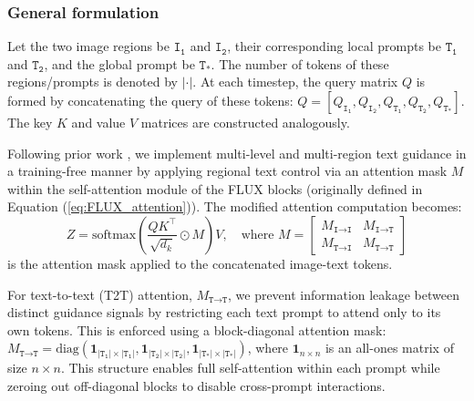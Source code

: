 \documentclass{article}
\begin{document}
\vspace{-1mm}
\subsubsection{General formulation}
\vspace{-1mm}

Let the two image regions be $\texttt{I}_\texttt{1}$ and $\texttt{I}_\texttt{2}$, their corresponding local prompts be $\texttt{T}_\texttt{1}$ and $\texttt{T}_\texttt{2}$, and the global prompt be $\texttt{T}_\texttt{*}$. The number of tokens of these regions/prompts is denoted by $|\cdot|$. At each timestep, the query matrix $Q$ is formed by concatenating the query of these tokens: $ Q= [Q_{\texttt{I}_\texttt{1}}, Q_{\texttt{I}_\texttt{2}}, Q_{\texttt{T}_\texttt{1}}, Q_{\texttt{T}_\texttt{2}}, Q_{\texttt{T}_\texttt{*}}]$. The key $K$ and value $V$ matrices are constructed analogously.

Following prior work \citep{chen2024training}, we implement multi-level and multi-region text guidance in a training-free manner by applying regional text control via an attention mask $M$ within the self-attention module of the FLUX blocks (originally defined in Equation (\ref{eq:FLUX_attention})). The modified attention computation becomes:
\begin{equation}
Z = \mathrm{softmax}\left(\frac{QK^\top}{\sqrt{d_k}} \odot M\right)V, \quad\text{where }M = \begin{bmatrix}
        M_{\texttt{I}\to\texttt{I}} &  M_{\texttt{I}\to\texttt{T}} \\
        M_{\texttt{T}\to\texttt{I}} &  M_{\texttt{T}\to\texttt{T}}
    \end{bmatrix}
\label{eq:masked_attention}
\end{equation}
is the attention mask applied to the concatenated image-text tokens.
    
For text-to-text (T2T) attention, $M_{\texttt{T}\to\texttt{T}}$, we prevent information leakage between distinct guidance signals by restricting each text prompt to attend only to its own tokens. This is enforced using a block-diagonal attention mask: $M_{\texttt{T}\to\texttt{T}}=\mathrm{diag}(\mathbf{1}_{|\texttt{T}_\texttt{1}| \times |\texttt{T}_\texttt{1}|}, \mathbf{1}_{|\texttt{T}_\texttt{2}| \times |\texttt{T}_\texttt{2}|},\mathbf{1}_{|\texttt{T}_\texttt{*}| \times|\texttt{T}_\texttt{*}|})$, where $\mathbf{1}_{n \times n}$ is an all-ones matrix of size $n \times n$. This structure enables full self-attention within each prompt while zeroing out off-diagonal blocks to disable cross-prompt interactions.
\end{document}
